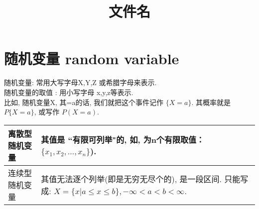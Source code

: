 \documentclass[UTF8]{ctexart}
\title{文件名}
\begin{document}
	\tableofcontents %
	\date{} %
	\maketitle  %
	
	
	
	\section{ 随机变量 random variable}
	
	随机变量: 常用大写字母X,Y,Z 或希腊字母来表示. \\
	随机变量的取值 : 用小写字母 x,y,z等表示. \\
	
	比如, 随机变量X,  其=a的话, 我们就把这个事件记作 $\{X=a\}$.  其概率就是 $ P\{X=a\}$, 或写作 $P(X=a)$. \\
	
	
	\begin{tabular}{|p{}|p{}|}
		\hline
		离散型随机变量 &  其值是 ``有限可列举"的, 如, 为n个有限取值：$ \{x_1, x_2, ... , x_n\}$).\\
		\hline
		连续型随机变量 &  \makecell[l]{ 其值无法逐个列举(即是无穷无尽个的), 是一段区间. \\ 只能写成: $X=\{x | a \leq x \leq b\}, -\infty < a < b < \infty $. } \\
		\hline
	\end{tabular}
	
	
	
	
	
	
	
	
	
\end{document}
